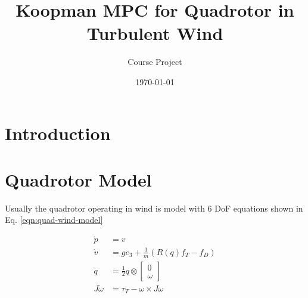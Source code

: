 \documentclass[11pt,a4paper]{article}
\title{Koopman MPC for Quadrotor in Turbulent Wind}
\author{Course Project}
\date{\today}
\begin{document}
	\maketitle
	
	\section{Introduction}
	
	\section{Quadrotor Model}
	Usually the quadrotor operating in wind is model with 6 DoF equations shown in Eq. \ref{eqn:quad-wind-model}
	
	\begin{align}
		\dot{p} &= v \\
		\dot{v} &= g e_3 + \frac{1}{m} (R(q) f_T - f_D) \\
		\dot{q} &= \frac{1}{2} q \otimes  \begin{bmatrix}0 \\ \omega \end{bmatrix} \\
		J \dot{\omega} &= \tau_T - \omega \times J \omega 
		\label{eqn:quad-wind-model}
	\end{align}
	
\end{document}
